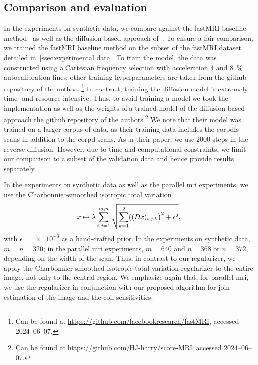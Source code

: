 \subsection{Comparison and evaluation}
In the experiments on synthetic data, we compare against the fastMRI baseline method~\cite{zbontar_fastmri_2018} as well as the diffusion-based approach of~\cite{chung_scoremri_2022}.
To ensure a fair comparison, we trained the fastMRI baseline method on the subset of the fastMRI dataset detailed in~\cref{ssec:experimental data}.
To train the model, the data was constructed using a Cartesian frequency selection with acceleration \num{4} and \qty{8}{\percent} autocalibration lines;
other training hyperparameters are taken from the github repository of the authors.\footnote{Can be found at \url{https://github.com/facebookresearch/fastMRI}, accessed 2024--06--07.}
In contrast, training the diffusion model is extremely time- and resource intensive.
Thus, to avoid training a model we took the implementation as well as the weights of a trained model of the diffusion-based approach the github repository of the authors.\footnote{Can be found at \url{https://github.com/HJ-harry/score-MRI}, accessed 2024--06--07.}
We note that their model was trained on a larger corpus of data, as their training data includes the \gls{corpdfs} scans in addition to the \gls{corpd} scans.
As in their paper, we use \num{2000} steps in the reverse diffusion.
However, due to time and computational constraints, we limit our comparison to a subset of the validation data and hence provide results separately.

In the experiments on synthetic data as well as the parallel \gls{mri} experiments, we use the Charbonnier-smoothed isotropic total variation
\begin{equation}
	x \mapsto \lambda \sum_{i,j=\num{1}}^{m,n} \sqrt{\sum_{k=\num{1}}^{\num{2}} \bigl((D x)_{i,j,k}\bigr)^{\num{2}} + \epsilon^{\num{2}}},
	\label{eq:charb}
\end{equation}
with \( \epsilon = \num{e-3} \) as a hand-crafted prior.
In the experiments on synthetic data, \( m = n = \num{320} \);
in the parallel \gls{mri} experiments, \( m = \num{640} \) and \( n = \num{368} \) or \( n = \num{372} \), depending on the width of the scan.
Thus, in contrast to our regularizer, we apply the Charbonnier-smoothed isotropic total variation regularizer to the entire image, not only to the central region.
We emphasize again that, for parallel \gls{mri}, we use the regularizer in conjunction with our proposed algorithm for join estimation of the image and the coil sensitivities.

